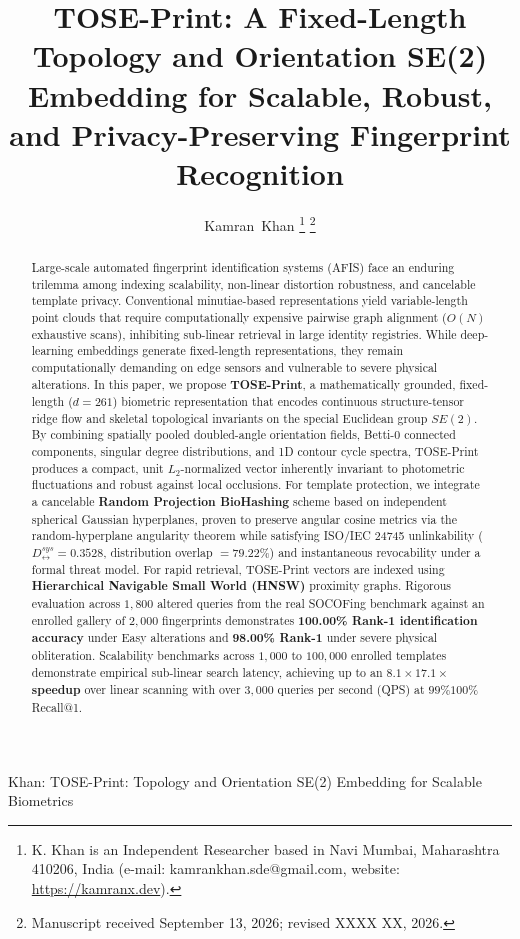 \documentclass[lettersize,journal]{IEEEtran}
\begin{document}
\title{TOSE-Print: A Fixed-Length Topology and Orientation SE(2) Embedding for Scalable, Robust, and Privacy-Preserving Fingerprint Recognition}

\author{Kamran~Khan
\thanks{K. Khan is an Independent Researcher based in Navi Mumbai, Maharashtra 410206, India (e-mail: kamrankhan.sde@gmail.com, website: \protect\url{https://kamranx.dev}).}%
\thanks{Manuscript received September 13, 2026; revised XXXX XX, 2026.}}

%
{Khan: TOSE-Print: Topology and Orientation SE(2) Embedding for Scalable Biometrics}

\maketitle

\begin{abstract}
Large-scale automated fingerprint identification systems (AFIS) face an enduring trilemma among indexing scalability, non-linear distortion robustness, and cancelable template privacy. Conventional minutiae-based representations yield variable-length point clouds that require computationally expensive pairwise graph alignment ($O(N)$ exhaustive scans), inhibiting sub-linear retrieval in large identity registries. While deep-learning embeddings generate fixed-length representations, they remain computationally demanding on edge sensors and vulnerable to severe physical alterations. In this paper, we propose \textbf{TOSE-Print}, a mathematically grounded, fixed-length ($d = 261$) biometric representation that encodes continuous structure-tensor ridge flow and skeletal topological invariants on the special Euclidean group $SE(2)$. By combining spatially pooled doubled-angle orientation fields, Betti-0 connected components, singular degree distributions, and 1D contour cycle spectra, TOSE-Print produces a compact, unit $L_2$-normalized vector inherently invariant to photometric fluctuations and robust against local occlusions. For template protection, we integrate a cancelable \textbf{Random Projection BioHashing} scheme based on independent spherical Gaussian hyperplanes, proven to preserve angular cosine metrics via the random-hyperplane angularity theorem while satisfying ISO/IEC 24745 unlinkability ($D_{\leftrightarrow}^{sys} = 0.3528$, distribution overlap $= 79.22\%$) and instantaneous revocability under a formal threat model. For rapid retrieval, TOSE-Print vectors are indexed using \textbf{Hierarchical Navigable Small World (HNSW)} proximity graphs. Rigorous evaluation across $1,800$ altered queries from the real SOCOFing benchmark against an enrolled gallery of $2,000$ fingerprints demonstrates \textbf{100.00\% Rank-1 identification accuracy} under Easy alterations and \textbf{98.00\% Rank-1} under severe physical obliteration. Scalability benchmarks across $1,000$ to $100,000$ enrolled templates demonstrate empirical sub-linear search latency, achieving up to an \textbf{$8.1\times$\textendash$17.1\times$ speedup} over linear scanning with over $3,000$ queries per second (QPS) at $99\%$\textendash$100\%$ Recall@1.
\end{abstract}
\end{document}
